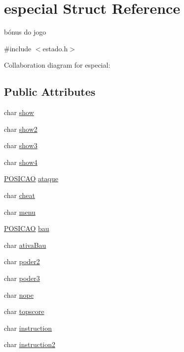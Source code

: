 \hypertarget{structespecial}{}\section{especial Struct Reference}
\label{structespecial}


bónus do jogo  




{\ttfamily \#include $<$estado.\+h$>$}



Collaboration diagram for especial\+:
\subsection*{Public Attributes}
\begin{DoxyCompactItemize}
\item 
char \hyperlink{structespecial_af031f31012955a6cfeae61fe3dae82dc}{show}
\item 
char \hyperlink{structespecial_aa1054ec08d0d79cdecc5276b48eee99a}{show2}
\item 
char \hyperlink{structespecial_a3a63cb0e37bfbdb7ed78f4daacb985a3}{show3}
\item 
char \hyperlink{structespecial_abc3893cf0d346b82f4747d9ccb25bcca}{show4}
\item 
\hyperlink{structposicao}{P\+O\+S\+I\+C\+AO} \hyperlink{structespecial_a6a77206f06920d5c2bca72c6ed74ac90}{ataque}
\item 
char \hyperlink{structespecial_a8c1a58b1321bb7a2c6eba4f4fa49fefe}{cheat}
\item 
char \hyperlink{structespecial_aadc0f3728cac058700a8b2aa144b7720}{menu}
\item 
\hyperlink{structposicao}{P\+O\+S\+I\+C\+AO} \hyperlink{structespecial_ad8054a7b690948458ec69411629ee0b3}{bau}
\item 
char \hyperlink{structespecial_ac67764954ed1ac6696403048870eba25}{ativa\+Bau}
\item 
char \hyperlink{structespecial_a9c1028cbef94087ff7bbffe460260528}{poder2}
\item 
char \hyperlink{structespecial_a322518f66509ede796d2d52d8424f4d0}{poder3}
\item 
char \hyperlink{structespecial_aeed061e97d44e7788b2c07a44f3ce3b3}{nope}
\item 
char \hyperlink{structespecial_a01ca8b58821f5369af7239c571d2b248}{topscore}
\item 
char \hyperlink{structespecial_a66223c39cedcea3a1185b0fc313880cf}{instruction}
\item 
char \hyperlink{structespecial_af4794f16d295ffd4ecb261aa7e2027c6}{instruction2}
\end{DoxyCompactItemize}


